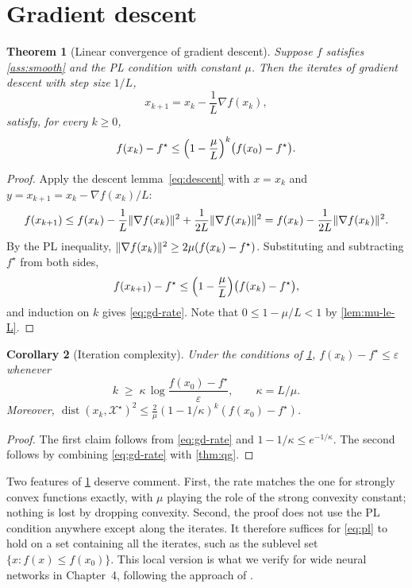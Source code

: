 \documentclass[11pt,a4paper,oneside]{report}
\theoremstyle{plain}
\newtheorem{theorem}{Theorem}[chapter]
\newtheorem{corollary}[theorem]{Corollary}
\theoremstyle{definition}
\theoremstyle{remark}
\newcommand{\X}{\mathcal{X}^\star}
\DeclarePairedDelimiter{\norm}{\lVert}{\rVert}
\DeclareMathOperator{\dist}{dist}
\begin{document}
\section{Gradient descent}
\label{sec:pl-gd}

\begin{theorem}[Linear convergence of gradient descent]\label{thm:gd}
Suppose $f$ satisfies \cref{ass:smooth} and the PL condition with constant $\mu$. Then the iterates of gradient descent with step size $1/L$,
\[
  x_{k+1} = x_k - \frac{1}{L}\nabla f(x_k),
\]
satisfy, for every $k\ge0$,
\begin{equation}\label{eq:gd-rate}
  f(x_k) - f^\star \le \Bigl(1 - \frac{\mu}{L}\Bigr)^{k}\bigl(f(x_0) - f^\star\bigr).
\end{equation}
\end{theorem}

\begin{proof}
Apply the descent lemma~\eqref{eq:descent} with $x = x_k$ and $y = x_{k+1} = x_k - \nabla f(x_k)/L$:
\[
  f(x_{k+1}) \le f(x_k) - \frac1L\norm{\nabla f(x_k)}^2 + \frac{1}{2L}\norm{\nabla f(x_k)}^2 = f(x_k) - \frac{1}{2L}\norm{\nabla f(x_k)}^2.
\]
By the PL inequality, $\norm{\nabla f(x_k)}^2 \ge 2\mu(f(x_k) - f^\star)$. Substituting and subtracting $f^\star$ from both sides,
\[
  f(x_{k+1}) - f^\star \le \Bigl(1 - \frac{\mu}{L}\Bigr)\bigl(f(x_k) - f^\star\bigr),
\]
and induction on $k$ gives \eqref{eq:gd-rate}. Note that $0\le 1 - \mu/L < 1$ by \cref{lem:mu-le-L}.
\end{proof}

\begin{corollary}[Iteration complexity]\label{cor:gd-complexity}
Under the conditions of \cref{thm:gd}, $f(x_k) - f^\star\le\varepsilon$ whenever
\[
  k \;\ge\; \kappa\,\log\frac{f(x_0) - f^\star}{\varepsilon}, \qquad \kappa = L/\mu.
\]
Moreover, $\dist(x_k, \X)^2 \le \frac{2}{\mu}(1 - 1/\kappa)^k(f(x_0) - f^\star)$.
\end{corollary}

\begin{proof}
The first claim follows from \eqref{eq:gd-rate} and $1 - 1/\kappa \le e^{-1/\kappa}$. The second follows by combining \eqref{eq:gd-rate} with \cref{thm:qg}.
\end{proof}

Two features of \cref{thm:gd} deserve comment. First, the rate matches the one for strongly convex functions exactly, with $\mu$ playing the role of the strong convexity constant; nothing is lost by dropping convexity. Second, the proof does not use the PL condition anywhere except along the iterates. It therefore suffices for \eqref{eq:pl} to hold on a set containing all the iterates, such as the sublevel set $\{x : f(x)\le f(x_0)\}$. This local version is what we verify for wide neural networks in Chapter~4, following the approach of \citet{liu2022}.
\end{document}
